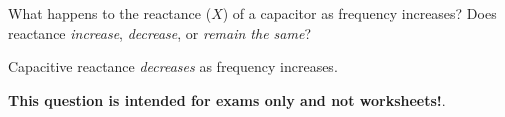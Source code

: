 

What happens to the reactance ($X$) of a capacitor as frequency increases?  Does reactance {\it increase}, {\it decrease}, or {\it remain the same}?







Capacitive reactance {\it decreases} as frequency increases.







{\bf This question is intended for exams only and not worksheets!}.



